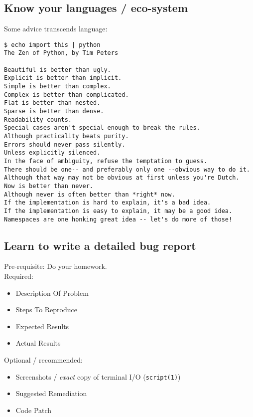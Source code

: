 \documentclass[xga]{xdvislides}
\begin{document}
\subsection{Know your languages / eco-system}
Some advice transcends language: \\

\small
\begin{verbatim}
$ echo import this | python
The Zen of Python, by Tim Peters

Beautiful is better than ugly.
Explicit is better than implicit.
Simple is better than complex.
Complex is better than complicated.
Flat is better than nested.
Sparse is better than dense.
Readability counts.
Special cases aren't special enough to break the rules.
Although practicality beats purity.
Errors should never pass silently.
Unless explicitly silenced.
In the face of ambiguity, refuse the temptation to guess.
There should be one-- and preferably only one --obvious way to do it.
Although that way may not be obvious at first unless you're Dutch.
Now is better than never.
Although never is often better than *right* now.
If the implementation is hard to explain, it's a bad idea.
If the implementation is easy to explain, it may be a good idea.
Namespaces are one honking great idea -- let's do more of those!
\end{verbatim}
\Normalsize

\subsection{Learn to write a detailed bug report}
Pre-requisite: Do your homework. \\

Required:
\begin{itemize}
	\item Description Of Problem
	\item Steps To Reproduce
	\item Expected Results
	\item Actual Results
\end{itemize}
\vspace{.125in}

Optional / recommended:
\begin{itemize}
	\item Screenshots / {\em exact} copy of terminal I/O ({\tt script(1)})
	\item Suggested Remediation
	\item Code Patch
\end{itemize}
\end{document}

